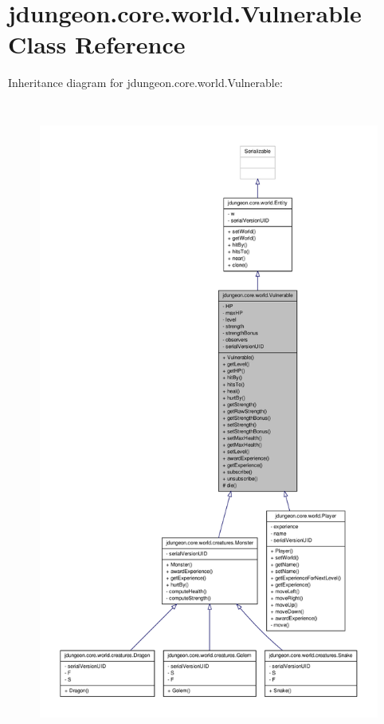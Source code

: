 \hypertarget{classjdungeon_1_1core_1_1world_1_1_vulnerable}{
\section{jdungeon.core.world.Vulnerable Class Reference}
\label{classjdungeon_1_1core_1_1world_1_1_vulnerable}
}


Inheritance diagram for jdungeon.core.world.Vulnerable:
\nopagebreak
\begin{figure}[H]
\begin{center}
\leavevmode
\includegraphics[height=600pt]{classjdungeon_1_1core_1_1world_1_1_vulnerable__inherit__graph}
\end{center}
\end{figure}


